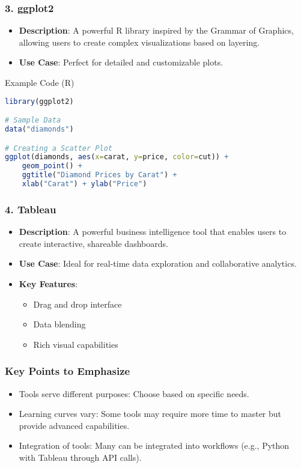 \documentclass[aspectratio=169]{beamer}
\begin{document}
\begin{frame}[fragile]
    \frametitle{3. ggplot2}
    \begin{itemize}
        \item \textbf{Description}: A powerful R library inspired by the Grammar of Graphics, allowing users to create complex visualizations based on layering.
        \item \textbf{Use Case}: Perfect for detailed and customizable plots.
    \end{itemize}
    \begin{block}{Example Code (R)}
        \begin{lstlisting}[language=R]
library(ggplot2)

# Sample Data
data("diamonds")

# Creating a Scatter Plot
ggplot(diamonds, aes(x=carat, y=price, color=cut)) + 
    geom_point() +
    ggtitle("Diamond Prices by Carat") +
    xlab("Carat") + ylab("Price")
        \end{lstlisting}
    \end{block}
\end{frame}

\begin{frame}
    \frametitle{4. Tableau}
    \begin{itemize}
        \item \textbf{Description}: A powerful business intelligence tool that enables users to create interactive, shareable dashboards.
        \item \textbf{Use Case}: Ideal for real-time data exploration and collaborative analytics.
        \item \textbf{Key Features}:
            \begin{itemize}
                \item Drag and drop interface
                \item Data blending
                \item Rich visual capabilities
            \end{itemize}
    \end{itemize}
\end{frame}

\begin{frame}
    \frametitle{Key Points to Emphasize}
    \begin{itemize}
        \item Tools serve different purposes: Choose based on specific needs.
        \item Learning curves vary: Some tools may require more time to master but provide advanced capabilities.
        \item Integration of tools: Many can be integrated into workflows (e.g., Python with Tableau through API calls).
    \end{itemize}
\end{frame}
\end{document}

